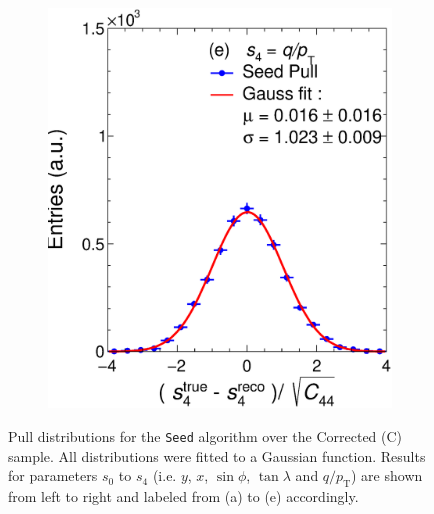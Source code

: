 \begin{figure}[t]
\begin{subfigure}{0.32\textwidth}
         \includegraphics[width=\textwidth]{figures/ch4-KF_NDGArLite/Toy/Corr/UnitSeed_p4.eps}
         \caption{}
         \label{fig:resp4Seed_GArLite_Corr}
     \end{subfigure}
        \caption{Pull distributions for the \texttt{Seed} algorithm over the Corrected (C) sample. All distributions were fitted to a Gaussian function. Results for parameters $s_0$ to $s_4$ (i.e. $y$, $x$, $\sin\phi$, $\tan\lambda$ and $q/p_{\text{T}}$) are shown from left to right and labeled from (a) to (e) accordingly. }
        \label{fig:ToyUnitSeed_GArLite_Corr}
\end{figure}

